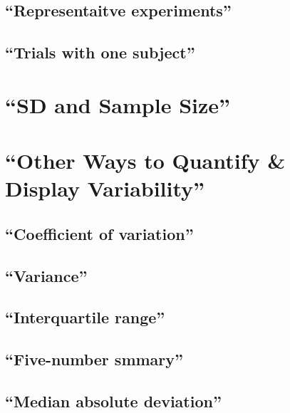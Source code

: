 \documentclass[]{book}
\theoremstyle{definition}
\theoremstyle{definition}
\theoremstyle{definition}
\theoremstyle{remark}
\begin{document}
\subsection{\texorpdfstring{``Representaitve
experiments''}{Representaitve experiments}}\label{representaitve-experiments}

\subsection{\texorpdfstring{``Trials with one
subject''}{Trials with one subject}}\label{trials-with-one-subject}

\section{\texorpdfstring{``SD and Sample
Size''}{SD and Sample Size}}\label{sd-and-sample-size}

\section{\texorpdfstring{``Other Ways to Quantify \& Display
Variability''}{Other Ways to Quantify \& Display Variability}}\label{other-ways-to-quantify-display-variability}

\subsection{\texorpdfstring{``Coefficient of
variation''}{Coefficient of variation}}\label{coefficient-of-variation}

\subsection{\texorpdfstring{``Variance''}{Variance}}\label{variance}

\subsection{\texorpdfstring{``Interquartile
range''}{Interquartile range}}\label{interquartile-range}

\subsection{\texorpdfstring{``Five-number
smmary''}{Five-number smmary}}\label{five-number-smmary}

\subsection{\texorpdfstring{``Median absolute
deviation''}{Median absolute deviation}}\label{median-absolute-deviation}
\end{document}
